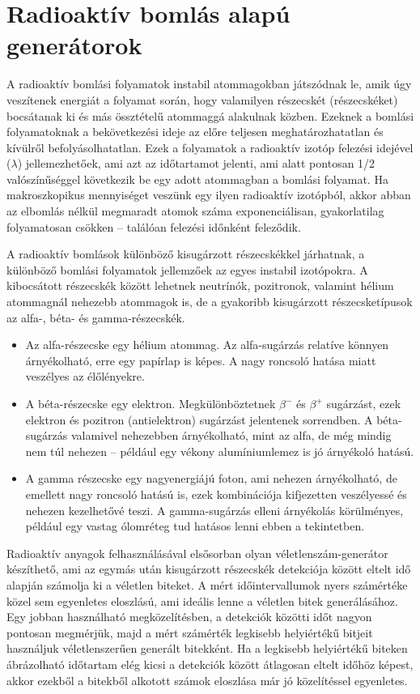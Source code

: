 \documentclass[12pt,a4paper,oneside]{article}
\begin{document}
\section*{Radioaktív bomlás alapú generátorok}
A  radioaktív bomlási folyamatok instabil atommagokban játszódnak le, amik úgy veszítenek energiát a folyamat során, hogy valamilyen részecskét (részecskéket) bocsátanak ki és más össztételű atommaggá alakulnak közben. Ezeknek a bomlási folyamatoknak a bekövetkezési ideje az előre teljesen meghatározhatatlan és kívülről befolyásolhatatlan. Ezek a folyamatok a radioaktív izotóp felezési idejével ($\lambda$) jellemezhetőek, ami azt az időtartamot jelenti, ami alatt pontosan 1/2 valószínűséggel következik be egy adott atommagban a bomlási folyamat. Ha makroszkopikus mennyiséget veszünk egy ilyen radioaktív izotópból, akkor abban az elbomlás nélkül megmaradt atomok száma exponenciálisan, gyakorlatilag folyamatosan csökken -- találóan felezési időnként feleződik.
\par
A radioaktív bomlások különböző kisugárzott részecskékkel járhatnak, a különböző bomlási folyamatok jellemzőek az egyes instabil izotópokra. A kibocsátott részecskék között lehetnek neutrínók, pozitronok, valamint hélium atommagnál nehezebb atommagok is, de a gyakoribb kisugárzott részecsketípusok az alfa-, béta- és gamma-részecskék.
\begin{itemize}
	\item Az alfa-részecske egy hélium atommag. Az alfa-sugárzás relatíve könnyen árnyékolható, erre egy papírlap is képes. A nagy roncsoló hatása miatt veszélyes az élőlényekre.
	\item A béta-részecske egy elektron. Megkülönböztetnek $\beta^-$ és $\beta^+$ sugárzást, ezek elektron és pozitron (antielektron) sugárzást jelentenek sorrendben. A béta-sugárzás valamivel nehezebben árnyékolható, mint az alfa, de még mindig nem túl nehezen -- például egy vékony alumíniumlemez is jó árnyékoló hatású.
	\item A gamma részecske egy nagyenergiájú foton, ami nehezen árnyékolható, de emellett nagy roncsoló hatású is, ezek kombinációja kifjezetten veszélyessé és nehezen kezelhetővé teszi. A gamma-sugárzás elleni árnyékolás körülményes, például egy vastag ólomréteg tud hatásos lenni ebben a tekintetben.
\end{itemize}
\par
Radioaktív anyagok felhasználásával elsősorban olyan véletlenszám-generátor készíthető, ami az egymás után kisugárzott részecskék detekciója között eltelt idő alapján számolja ki a véletlen biteket. A mért időintervallumok nyers számértéke közel sem egyenletes eloszlású, ami ideális lenne a véletlen bitek generálásához. Egy jobban használható megközelítésben, a detekciók közötti időt nagyon pontosan megmérjük, majd a mért számérték legkisebb helyiértékű bitjeit használjuk véletlenszerűen generált bitekként. Ha a legkisebb helyiértékű biteken ábrázolható időtartam elég kicsi a detekciók között átlagosan eltelt időhöz képest, akkor ezekből a bitekből alkotott számok eloszlása már jó közelítéssel egyenletes.
\end{document}
